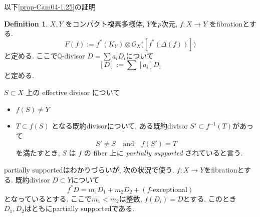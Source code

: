 \documentclass[dvipdfmx,a4paper,11pt]{article} %
\theoremstyle{definition}
\newtheorem{defn}[thm]{Definition}
\theoremstyle{remark}
\numberwithin{equation}{section}
\newcommand{\Q}{\mathbb{Q}}
\begin{document}
以下\ref{prop-Cam04-1.25}の証明

\begin{defn}\cite[Definition 1.20, 1.21]{Cam04}
\(X, Y\) をコンパクト複素多様体, $Y$を$p$次元, 
\(f : X \rightarrow Y\) をfibrationとする. 
\[
F(f) := f^*(K_Y) \otimes \mathcal{O}_X\bigl([f^*(\Delta(f))]\bigr)
\]
と定める.
ここで$\Q$-divisor $D= \sum a_i D_i$について 
$$
[D]:= \sum [a_i]D_i
$$と定める. 

\(S \subset X\) 上の effective divisor について
\begin{itemize}
\item \(f(S) \ne Y\) 
\item \(T \subset f(S)\) となる既約divisorについて, ある既約divisor $S' \subset f^{-1}(T)$があって
$$
S ' \neq S \quad \text{and} \quad f(S')=T
$$
を満たすとき, \(S\) は \(f\) の fiber 上に \emph{partially supported} されていると言う.
\end{itemize}
\end{defn}
partially supportedはわかりづらいが, 次の状況で使う.
$f : X \to Y$をfibrationとする. 既約divisor $D \subset Y$について
$$ 
f^{*}D = m_1D_1 + m_2 D_2 + (\text{$f$-exceptional})
$$ 
となっているとする. ここで$m_1 <m_2$は整数, $f(D_i)=D$とする. 
このとき$D_1, D_2$はともにpartially supportedである. 

\end{document}
